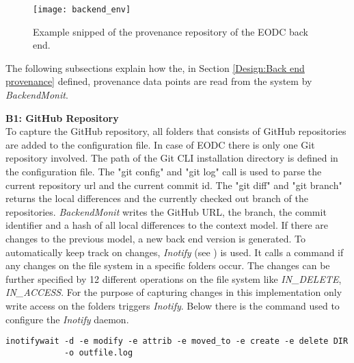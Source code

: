 \documentclass[draft,final]{vutinfth} %
\begin{document}
\begin{figure}[h]
	\centering
	\texttt{[image: backend\_env]}
	\caption{Example snipped of the provenance repository of the EODC back end.}
	\label{fig:backendprovcm} %
\end{figure}

The following subsections explain how the, in Section \ref{Design:Back end provenance} defined, provenance data points are read from the system by \textit{BackendMonit}.  

\textbf{B1: GitHub Repository} \\
To capture the GitHub repository, all folders that consists of GitHub repositories are added to the configuration file. In case of EODC there is only one Git repository involved. The path of the Git CLI installation directory is defined in the configuration file. The "git config" and "git log" call is used to parse the current repository url and the current commit id. The "git diff" and "git branch" returns the local differences and the currently checked out branch of the repositories. \textit{BackendMonit} writes the GitHub URL, the branch, the commit identifier and a hash of all local differences to the context model. If there are changes to the previous model, a new back end version is generated. To automatically keep track on changes, \textit{Inotify} (see \cite{inotify}) is used. It calls a command if any changes on the file system in a specific folders occur. The changes can be further specified by 12 different operations on the file system like \textit{IN\_DELETE}, \textit{IN\_ACCESS}. For the purpose of capturing changes in this implementation only write access on the folders triggers \textit{Inotify}. Below there is the command used to configure the \textit{Inotify} daemon. \\
 
\begin{lstlisting}[frame=single]
inotifywait -d -e modify -e attrib -e moved_to -e create -e delete DIR 
		    -o outfile.log
\end{lstlisting}



\end{document}
